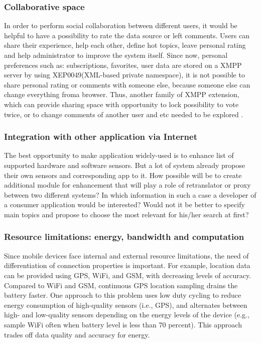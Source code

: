         \subsubsection{Collaborative space}
         In order to perform social collaboration between different users, it would be helpful to have a possibility to rate the data source or left comments. Users can share their experience, help each other, define hot topics, leave personal rating and help administrator to improve the system itself. Since now, personal preferences such as: subscriptions, favorites, user data are stored on a XMPP server by using XEP0049(XML-based private namespace), it is not possible to share personal rating or comments with someone else, because someone else can change everything froma  browser. Thus, another family of XMPP extension, which can provide sharing space with opportunity to lock possibility to vote twice, or to change comments of another user and etc needed to be explored .  

		\subsubsection {Integration with other application via Internet}
		 The best opportunity to make application widely-used is to enhance list of supported hardware and software sensors. But a lot of system already propose their own sensors and corresponding app to it. How possible will be to create additional module for enhancement that will play a role of retranslator or proxy between two different systems? In which information in such a case a developer of a consumer application would be interested? Would not it be better to specify main topics and propose to choose the most relevant for his/her search at first?

		\subsubsection {Resource limitations: energy, bandwidth and computation}
		Since mobile devices face internal and external resource limitations, the need of differentiation of connection properties is important. For example, location data can be provided using GPS, WiFi, and GSM, with decreasing levels of accuracy. Compared to WiFi and GSM, continuous GPS location sampling drains the battery faster. One approach to this problem uses low duty cycling to reduce energy consumption of high-quality sensors (i.e., GPS), and alternates between high- and low-quality sensors depending on the energy levels of the device (e.g., sample WiFi often when battery level is less than 70 percent). This approach trades off data quality and accuracy for energy. 

